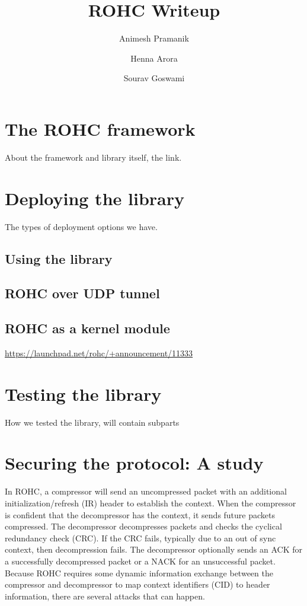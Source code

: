 \documentclass[a4paper,11pt]{article}
\author{
	Animesh Pramanik \\
	\and
	Henna Arora\\
	\and
	Sourav Goswami}
\title{ROHC Writeup}
\begin{document}
\maketitle
\pagebreak
\tableofcontents
\pagebreak

\section{The ROHC framework}
About the framework and library itself, the link.
\pagebreak

\section{Deploying the library}
The types of deployment options we have.
\subsection{Using the library}
\subsection{ROHC over UDP tunnel}
\subsection{ROHC as a kernel module}
\url{https://launchpad.net/rohc/+announcement/11333}

\pagebreak
\section{Testing the library}
How we tested the library, will contain subparts

\pagebreak
\section{Securing the protocol: A study}
In  ROHC, a compressor will send an uncompressed packet with an additional initialization/refresh (IR) header to establish the context. When the compressor is confident that the decompressor has the context, it sends future packets compressed. The decompressor decompresses packets and checks the cyclical redundancy check (CRC). If the CRC fails, typically due to an out of sync context, then decompression fails. The decompressor optionally sends an ACK for a successfully decompressed packet or a NACK for an unsuccessful packet.\\
Because ROHC requires some dynamic information exchange between the compressor and decompressor to map context  identifiers (CID) to header information, there are several attacks that can happen.
\end{document}
